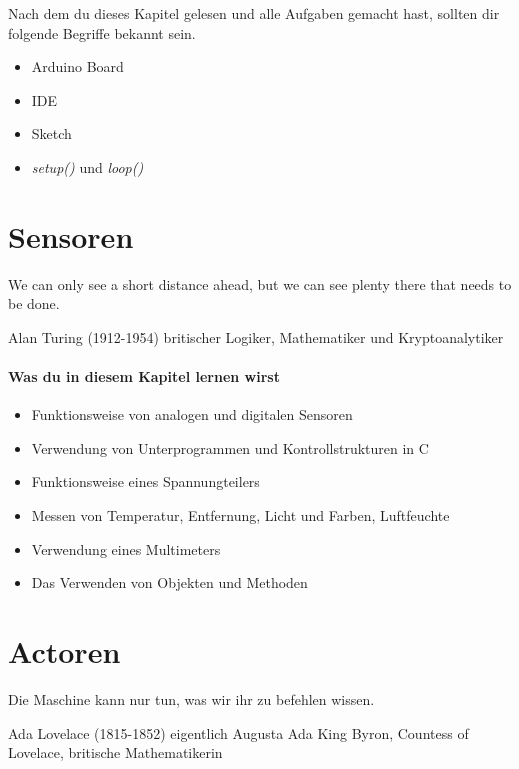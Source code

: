 \documentclass[11pt,openany,twoside]{scrreprt}
\begin{document}
Nach dem du dieses Kapitel gelesen und alle Aufgaben gemacht hast, sollten dir folgende Begriffe bekannt sein.
\begin{itemize}
\item Arduino Board
\item IDE
\item Sketch
\item \textit{setup()} und \textit{loop()}
\end{itemize}




\chapter{Sensoren}

\epigraph{We can only see a short distance ahead, but we can see plenty there that needs to be done.}{Alan Turing (1912-1954) britischer Logiker, Mathematiker und Kryptoanalytiker}

\subsubsection{Was du in diesem Kapitel lernen wirst}
\begin{itemize}
  \item Funktionsweise von analogen und digitalen Sensoren
  \item Verwendung von Unterprogrammen und Kontrollstrukturen in C
  \item Funktionsweise eines Spannungteilers 
  \item Messen von Temperatur, Entfernung, Licht und Farben, Luftfeuchte
  \item Verwendung eines Multimeters 
  \item Das Verwenden von Objekten und Methoden 
\end{itemize}




\chapter{Actoren}

\epigraph{Die Maschine kann nur tun, was wir ihr zu befehlen wissen.}{Ada Lovelace (1815-1852) eigentlich Augusta Ada King Byron, Countess of Lovelace,
britische Mathematikerin }
\minitoc%

\end{document}
